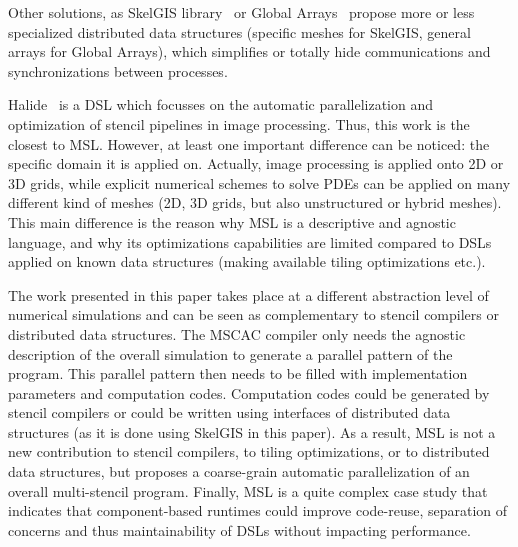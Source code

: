 Other solutions, as SkelGIS library~\cite{CPE:CPE3494} or Global Arrays~\cite{Nieplocha:2006:AAP:1125980.1125985} propose more or less specialized distributed data structures (specific meshes for SkelGIS, general arrays for Global Arrays), which simplifies or totally hide communications and synchronizations between processes.

Halide~\cite{Ragan-Kelley:2013:HLC:2491956.2462176} is a DSL which focusses on the automatic parallelization and optimization of stencil pipelines in image processing. Thus, this work is the closest to MSL. However, at least one important difference can be noticed: the specific domain it is applied on. Actually, image processing is applied onto 2D or 3D grids, while explicit numerical schemes to solve PDEs can be applied on many different kind of meshes (2D, 3D grids, but also unstructured or hybrid meshes). This main difference is the reason why MSL is a descriptive and agnostic language, and why its optimizations capabilities are limited compared to DSLs applied on known data structures (making available tiling optimizations etc.).

The work presented in this paper takes place at a different abstraction level of numerical simulations and can be seen as complementary to stencil compilers or distributed data structures. The MSCAC compiler only needs the agnostic description of the overall simulation to generate a parallel pattern of the program. This parallel pattern then needs to be filled with implementation parameters and computation codes.
Computation codes could be generated by stencil compilers or could be written using interfaces of distributed data structures (as it is done using SkelGIS in this paper). As a result, MSL is not a new contribution to stencil compilers, to tiling optimizations, or to distributed data structures, but proposes a coarse-grain automatic parallelization of an overall multi-stencil program.
Finally, MSL is a quite complex case study that indicates that component-based runtimes could improve code-reuse, separation of concerns and thus maintainability of DSLs without impacting performance. 


